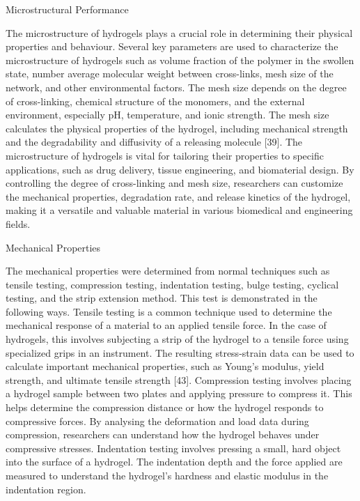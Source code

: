 \documentclass[../../main-notes.tex]{subfiles}
\begin{document}
Microstructural Performance 

The microstructure of hydrogels plays a crucial role in determining their physical properties and behaviour. 
Several key parameters are used to characterize the microstructure of hydrogels such as volume fraction of the polymer in the swollen state, number average molecular weight between cross-links, mesh size of the network, and other environmental factors. 
The mesh size depends on the degree of cross-linking, chemical structure of the monomers, and the external environment, especially pH, temperature, and ionic strength. 
The mesh size calculates the physical properties of the hydrogel, including mechanical strength and the degradability and diffusivity of a releasing molecule [39]. 
The microstructure of hydrogels is vital for tailoring their properties to specific applications, such as drug delivery, tissue engineering, and biomaterial design. 
By controlling the degree of cross-linking and mesh size, researchers can customize the mechanical properties, degradation rate, and release kinetics of the hydrogel, making it a versatile and valuable material in various biomedical and engineering fields. 




Mechanical Properties

The mechanical properties were determined from normal techniques such as tensile testing, compression testing, indentation testing, bulge testing, cyclical testing, and the strip extension method. 
This test is demonstrated in the following ways. 
Tensile testing is a common technique used to determine the mechanical response of a material to an applied tensile force. 
In the case of hydrogels, this involves subjecting a strip of the hydrogel to a tensile force using specialized grips in an instrument. 
The resulting stress-strain data can be used to calculate important mechanical properties, such as Young’s modulus, yield strength, and ultimate tensile strength [43]. 
Compression testing involves placing a hydrogel sample between two plates and applying pressure to compress it. 
This helps determine the compression distance or how the hydrogel responds to compressive forces. 
By analysing the deformation and load data during compression, researchers can understand how the hydrogel behaves under compressive stresses. 
Indentation testing involves pressing a small, hard object into the surface of a hydrogel. 
The indentation depth and the force applied are measured to understand the hydrogel’s hardness and elastic modulus in the indentation region. 
\end{document}
